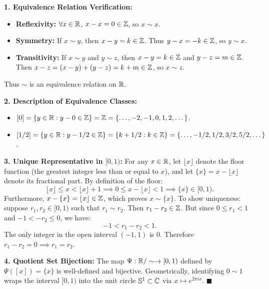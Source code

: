 \begin{solution}
\textbf{1. Equivalence Relation Verification:}
\begin{itemize}[leftmargin=1.5em,itemsep=1pt]
  \item \textbf{Reflexivity:} $\forall x \in \mathbb{R}$, $x - x = 0 \in \mathbb{Z}$, so $x \sim x$.
  \item \textbf{Symmetry:} If $x \sim y$, then $x - y = k \in \mathbb{Z}$. Thus $y - x = -k \in \mathbb{Z}$, so $y \sim x$.
  \item \textbf{Transitivity:} If $x \sim y$ and $y \sim z$, then $x - y = k \in \mathbb{Z}$ and $y - z = m \in \mathbb{Z}$. Then $x - z = (x - y) + (y - z) = k + m \in \mathbb{Z}$, so $x \sim z$.
\end{itemize}
Thus $\sim$ is an equivalence relation on $\mathbb{R}$.

\textbf{2. Description of Equivalence Classes:}
\begin{itemize}[leftmargin=1.5em,itemsep=1pt]
  \item $[0] = \{y \in \mathbb{R} : y - 0 \in \mathbb{Z}\} = \mathbb{Z} = \{\dots, -2, -1, 0, 1, 2, \dots\}$.
  \item $[1/2] = \{y \in \mathbb{R} : y - 1/2 \in \mathbb{Z}\} = \{k + 1/2 : k \in \mathbb{Z}\} = \{\dots, -1/2, 1/2, 3/2, 5/2, \dots\}$.
\end{itemize}

\textbf{3. Unique Representative in $[0, 1)$:}
For any $x \in \mathbb{R}$, let $\lfloor x \rfloor$ denote the floor function (the greatest integer less than or equal to $x$), and let $\{x\} = x - \lfloor x \rfloor$ denote its fractional part.
By definition of the floor:
\[
\lfloor x \rfloor \le x < \lfloor x \rfloor + 1 \implies 0 \le x - \lfloor x \rfloor < 1 \implies \{x\} \in [0, 1).
\]
Furthermore, $x - \{x\} = \lfloor x \rfloor \in \mathbb{Z}$, which proves $x \sim \{x\}$.
To show uniqueness: suppose $r_1, r_2 \in [0, 1)$ such that $r_1 \sim r_2$.
Then $r_1 - r_2 \in \mathbb{Z}$. But since $0 \le r_1 < 1$ and $-1 < -r_2 \le 0$, we have:
\[
-1 < r_1 - r_2 < 1.
\]
The only integer in the open interval $(-1, 1)$ is $0$. Therefore $r_1 - r_2 = 0 \implies r_1 = r_2$.

\textbf{4. Quotient Set Bijection:}
The map $\Psi: \mathbb{R}/\sim \to [0, 1)$ defined by $\Psi([x]) = \{x\}$ is well-defined and bijective. Geometrically, identifying $0 \sim 1$ wraps the interval $[0, 1)$ into the unit circle $\mathbb{S}^1 \subset \mathbb{C}$ via $x \mapsto e^{2\pi i x}$. \hfill $\blacksquare$
\end{solution}

